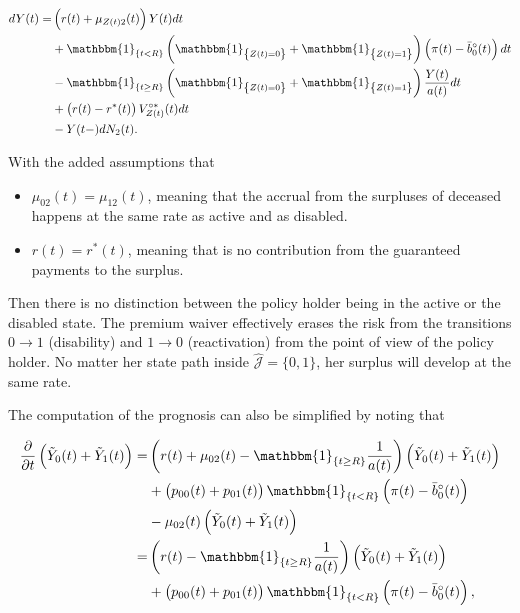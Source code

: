 \documentclass{book}
\newcommand{\1}[1]{\mathbbm{1}_{\left\lbrace #1 \right\rbrace}}
\theoremstyle{break}
\theoremstyle{remark}
\numberwithin{equation}{section}
\begin{document}
\begin{align*}
\begin{split}
	dY(t) =& \left( r(t) + \mu_{Z(t)2}(t) \right) Y(t) dt \\
	&+ \1{t<R} \left( \1{Z(t)=0} + \1{Z(t)=1} \right) \left(\pi(t) - \bar{b}_0^\circ(t) \right) dt \\
	&- \1{t \geq R} \left( \1{Z(t)=0} + \1{Z(t)=1} \right) \frac{Y(t)}{a(t)} dt \\
	&+ \left( r(t) - r^*(t) \right) V_{Z(t)}^{\circ*}(t) dt \\
	&- Y(t-) dN_2(t).
\end{split}
\end{align*}

With the added assumptions that

\begin{itemize}
	\item $\mu_{02}(t) = \mu_{12}(t)$, meaning that the accrual from the surpluses of deceased happens at the same rate as active and as disabled.
	\item $r(t) = r^*(t)$, meaning that is no contribution from the guaranteed payments to the surplus.
\end{itemize}

Then there is no distinction between the policy holder being in the active or the disabled state. The premium waiver effectively erases the risk from the transitions $0 \to 1$ (disability) and $1 \to 0$ (reactivation) from the point of view of the policy holder. No matter her state path inside $\hat{\mathcal{J}} = \{ 0,1 \}$, her surplus will develop at the same rate.

The computation of the prognosis can also be simplified by noting that

\begin{align*}
	\frac{\partial}{\partial t} \left(\tilde{Y}_0(t) + \tilde{Y}_1(t)\right) =& \left( r(t) + \mu_{02}(t) - \1{t \geq R} \frac{1}{a(t)}\right) \left(\tilde{Y}_0(t) + \tilde{Y}_1(t)\right) \\
	&+ \left(p_{00}(t) + p_{01}(t)\right)\1{t<R}\left(\pi(t) - \bar{b}_0^\circ(t)\right) \\
	&- \mu_{02}(t) \left(\tilde{Y}_0(t) + \tilde{Y}_1(t)\right) \\
	=& \left( r(t) - \1{t \geq R} \frac{1}{a(t)}\right) \left(\tilde{Y}_0(t) + \tilde{Y}_1(t)\right) \\
	&+ \left(p_{00}(t) + p_{01}(t)\right)\1{t<R}\left(\pi(t) - \bar{b}_0^\circ(t)\right),
\end{align*}
\end{document}
